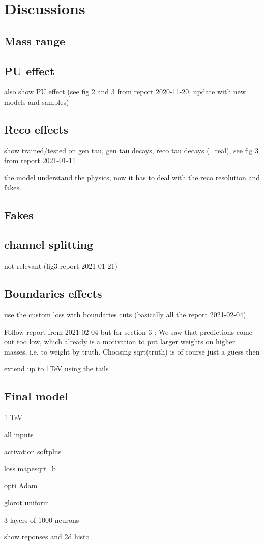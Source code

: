 \section{Discussions}\label{chapter-ML-section-discussion}

\subsection{Mass range}

\subsection{PU effect}
also show PU effect (see fig 2 and 3 from report 2020-11-20, update with new models and samples)

\subsection{Reco effects}
show trained/tested on gen tau, gen tau decays, reco tau decays (=real), see fig 3 from report 2021-01-11

the model understand the physics, now it has to deal with the reco resolution and fakes.

\subsection{Fakes}

\subsection{channel splitting}
not relevant (fig3 report  2021-01-21)

\subsection{Boundaries effects}
use the custom loss with boundaries cuts (basically all the report 2021-02-04)

Follow report from 2021-02-04 but for section 3 : We saw that predictions come out too low, which already is a motivation to put larger weights on higher masses, i.e. to weight by truth. Choosing sqrt(truth) is of course just a guess then

extend up to 1TeV using the tails


\subsection{Final model}

\DEEPTAU

1 TeV

all inputs

activation softplus

loss mapesqrt\_b

opti Adam

glorot uniform

3 layers of 1000 neurons

show reponses and 2d histo
